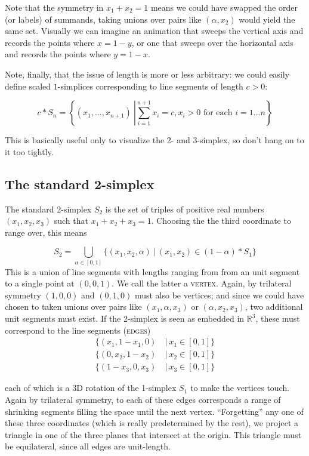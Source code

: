 \documentclass{tufte-handout}
\newcommand{\define}{\textsc}
\newcommand{\re}{\mathbb{R}}
\begin{document}
Note that the symmetry in $x_1+x_2=1$ means we could have swapped the order (or labels) of summands, taking unions over pairs like $(\alpha,x_2)$ would yield the same set. Visually we can imagine an animation that sweeps the vertical axis and records the points where $x=1-y$, or one that sweeps over the horizontal axis and records the points where $y=1-x$.

Note, finally, that the issue of length is more or less arbitrary: we could easily define scaled $1$-simplices corresponding to line segments of length $c>0$: 
{\[
c * S_n = \left\{(x_1,\dots,x_{n+1})\ \left| \sum_{i=1}^{n+1} x_i = c\right., x_i > 0 \text{ for each } i=1\dots n\right\}
\]

This is basically useful only to visualize the 2- and 3-simplex, so don't hang on to it too tightly.
}
\subsection{The standard 2-simplex}
The standard 2-simplex $S_2$ is the set of triples of positive real numbers $(x_1,x_2,x_3)$ such that $x_1+x_2+x_3=1$. Choosing the the third coordinate to range over, this means

\begin{equation}
    S_2 =  \bigcup_{\alpha\in[0,1]} \{(x_1,x_2,\alpha)\ |\ (x_1,x_2)\in (1-\alpha)*S_1\}
    \label{union-view-2}
\end{equation}
This is a union of line segments with lengths ranging from from an unit segment to a single point at $(0,0,1)$. We call the latter a \define{vertex}. Again, by trilateral symmetry $(1,0,0)$ and $(0,1,0)$ must also be vertices; and since we could have chosen to taken unions over pairs like $(x_1, \alpha,x_3)$ or $(\alpha,x_2,x_3)$, two additional unit segments must exist. If the 2-simplex is seen as embedded in $\re^3$, these must correspond to the line segments (\define{edges})
\begin{align*}
\{(x_1,1-x_1,0)\ &|\  x_1\in[0,1]\}\\
\{(0,x_2,1-x_2)\ &|\ x_2 \in[0,1]\}\\
\{(1-x_3,0,x_3)\ &|\ x_3\in[0,1]\}
\end{align*}

each of which is a 3D rotation of the 1-simplex $S_1$ to make the vertices touch. Again by trilateral symmetry, to each of these edges corresponds a range of shrinking segments filling the space until the next vertex. ``Forgetting'' any one of these three coordinates (which is really predetermined by the rest), we project a triangle in one of the three planes that intersect at the origin. This triangle must be equilateral, since all edges are unit-length.
\end{document}
